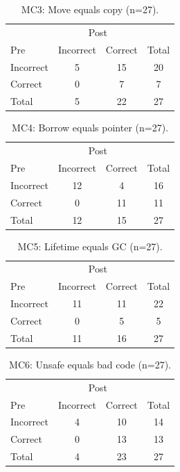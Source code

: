 \documentclass[11pt]{article}
\begin{document}
\begin{table}[h]
\centering
\caption{MC3: Move equals copy (n=27).}
\label{tab:transition-mc3}
\begin{tabular}{l|cc|c}
\toprule
 & \multicolumn{2}{c|}{Post} & \multicolumn{1}{c}{} \\
Pre & Incorrect & Correct & Total \\
\midrule
Incorrect & 5 & 15 & 20 \\
Correct & 0 & 7 & 7 \\
\midrule
Total & 5 & 22 & 27 \\
\bottomrule
\end{tabular}
\end{table}

\begin{table}[h]
\centering
\caption{MC4: Borrow equals pointer (n=27).}
\label{tab:transition-mc4}
\begin{tabular}{l|cc|c}
\toprule
 & \multicolumn{2}{c|}{Post} & \multicolumn{1}{c}{} \\
Pre & Incorrect & Correct & Total \\
\midrule
Incorrect & 12 & 4 & 16 \\
Correct & 0 & 11 & 11 \\
\midrule
Total & 12 & 15 & 27 \\
\bottomrule
\end{tabular}
\end{table}

\begin{table}[h]
\centering
\caption{MC5: Lifetime equals GC (n=27).}
\label{tab:transition-mc5}
\begin{tabular}{l|cc|c}
\toprule
 & \multicolumn{2}{c|}{Post} & \multicolumn{1}{c}{} \\
Pre & Incorrect & Correct & Total \\
\midrule
Incorrect & 11 & 11 & 22 \\
Correct & 0 & 5 & 5 \\
\midrule
Total & 11 & 16 & 27 \\
\bottomrule
\end{tabular}
\end{table}

\begin{table}[h]
\centering
\caption{MC6: Unsafe equals bad code (n=27).}
\label{tab:transition-mc6}
\begin{tabular}{l|cc|c}
\toprule
 & \multicolumn{2}{c|}{Post} & \multicolumn{1}{c}{} \\
Pre & Incorrect & Correct & Total \\
\midrule
Incorrect & 4 & 10 & 14 \\
Correct & 0 & 13 & 13 \\
\midrule
Total & 4 & 23 & 27 \\
\bottomrule
\end{tabular}
\end{table}
\end{document}

